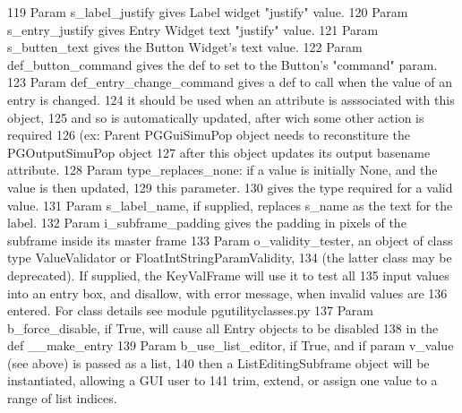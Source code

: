 \begin{DoxyCode}
119 \textcolor{stringliteral}{        Param s\_label\_justify gives Label widget "justify" value.}
120 \textcolor{stringliteral}{        Param s\_entry\_justify gives Entry Widget text "justify" value.}
121 \textcolor{stringliteral}{        Param s\_butten\_text gives the Button Widget's text value.}
122 \textcolor{stringliteral}{        Param def\_button\_command gives the def to set to the Button's "command" param.}
123 \textcolor{stringliteral}{        Param def\_entry\_change\_command gives a def to call when the value of an entry is changed.           
        }
124 \textcolor{stringliteral}{              it should be used when an attribute is asssociated with this object,}
125 \textcolor{stringliteral}{              and so is automatically updated, after wich some other action is required }
126 \textcolor{stringliteral}{              (ex: Parent PGGuiSimuPop object needs to reconstiture the PGOutputSimuPop object }
127 \textcolor{stringliteral}{              after this object updates its output basename attribute.}
128 \textcolor{stringliteral}{        Param type\_replaces\_none: if a value is initially None, and the value is then updated, }
129 \textcolor{stringliteral}{              this parameter.}
130 \textcolor{stringliteral}{              gives the type required for a valid value.}
131 \textcolor{stringliteral}{        Param s\_label\_name, if supplied, replaces s\_name as the text for the label.}
132 \textcolor{stringliteral}{        Param i\_subframe\_padding gives the padding in pixels of the subframe inside its master frame}
133 \textcolor{stringliteral}{        Param o\_validity\_tester, an object of class type ValueValidator or FloatIntStringParamValidity,}
134 \textcolor{stringliteral}{              (the latter class may be deprecated). If supplied, the KeyValFrame will use it to test all}
135 \textcolor{stringliteral}{              input values into an entry box, and disallow, with error message, when invalid values are}
136 \textcolor{stringliteral}{              entered. For class details see module pgutilityclasses.py}
137 \textcolor{stringliteral}{        Param b\_force\_disable, if True, will cause all Entry objects to be disabled }
138 \textcolor{stringliteral}{              in the def \_\_make\_entry}
139 \textcolor{stringliteral}{        Param b\_use\_list\_editor, if True, and if param v\_value (see above) is passed as a list, }
140 \textcolor{stringliteral}{              then a ListEditingSubframe object will be instantiated, allowing a GUI user to}
141 \textcolor{stringliteral}{              trim, extend, or assign one value to a range of list indices.}

\end{DoxyCode}
